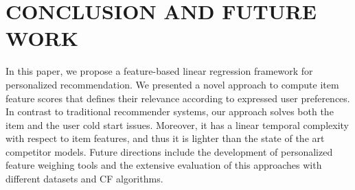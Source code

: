 \documentclass{sig-alternate}
\begin{document}
\section{CONCLUSION AND FUTURE WORK}
In this paper, we propose a feature-based linear regression framework 
for personalized recommendation. We presented a novel approach 
to compute item feature scores that defines their relevance
according to expressed user preferences. In contrast to traditional
recommender systems, our approach solves both the item and the
user cold start issues. Moreover, it has a linear temporal complexity
with respect to item features, and thus it is lighter than the
state of the art competitor models. Future directions include the
development of personalized feature weighing tools and the extensive 
evaluation of this approaches with different datasets and CF
algorithms.




\balancecolumns
\end{document}
